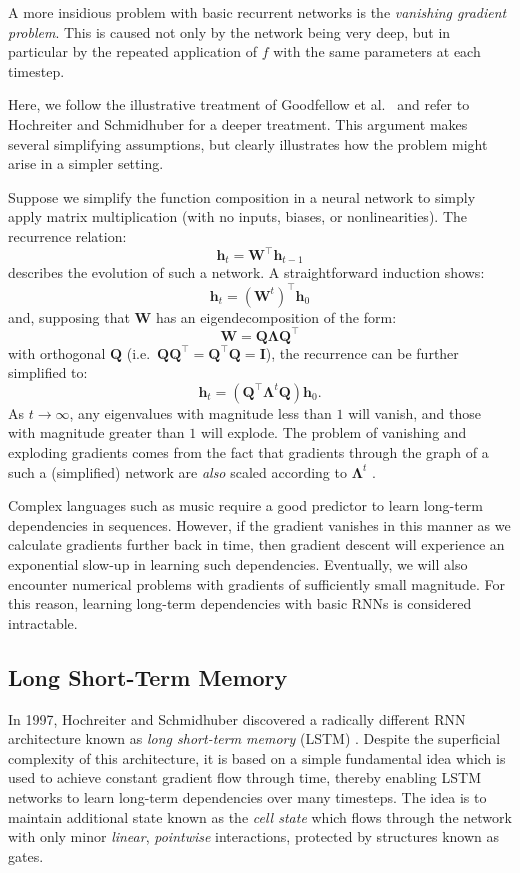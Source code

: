 \documentclass[12pt,a4paper,twoside,openright]{report}
\newcommand{\vect}[1]{\boldsymbol{\mathbf{#1}}}
\begin{document}
A more insidious problem with basic recurrent networks is the \emph{vanishing
gradient problem}. This is caused not only by the network being very deep, but
in particular by the repeated application of $f$ with the same parameters at
each timestep.

Here, we follow the illustrative treatment of Goodfellow et al.\
\cite{Goodfellow-et-al-2016} and refer to Hochreiter and Schmidhuber
\cite{hochreiter1997long} for a deeper treatment. This argument makes several
simplifying assumptions, but clearly illustrates how the problem might arise in
a simpler setting.

Suppose we simplify the function composition in a neural network to simply apply
matrix multiplication (with no inputs, biases, or nonlinearities). The
recurrence relation: 
$$ \vect{h}_t = \vect{W}^\top \vect{h}_{t-1} $$ 
describes the evolution of such a network. A straightforward induction shows:
$$ \vect{h}_t = (\vect{W}^t)^\top\vect{h}_0 $$
and, supposing that $\vect{W}$ has an eigendecomposition of the form:
$$ \vect{W} = \vect{Q}\vect{\Lambda}\vect{Q}^\top $$
with orthogonal $\vect{Q}$ (i.e.\ $\vect{Q}\vect{Q}^\top = \vect{Q}^\top\vect{Q}
= \vect{I}$), the recurrence can be further simplified to:
$$ \vect{h}_t = (\vect{Q}^\top \vect{\Lambda}^t \vect{Q}) \vect{h}_0. $$
As $t \rightarrow \infty$, any eigenvalues with magnitude less than $1$ will
vanish, and those with magnitude greater than $1$ will explode. The problem of
vanishing and exploding gradients comes from the fact that gradients through the
graph of a such a (simplified) network are \emph{also} scaled according to
$\vect{\Lambda}^t$ \cite{Goodfellow-et-al-2016}.

Complex languages such as music require a good predictor to learn long-term
dependencies in sequences. However, if the gradient vanishes in this manner as
we calculate gradients further back in time, then gradient descent will
experience an exponential slow-up in learning such dependencies. Eventually,
we will also encounter numerical problems with gradients of sufficiently small
magnitude. For this reason, learning long-term dependencies with basic RNNs is
considered intractable.

\subsection{Long Short-Term Memory}

In 1997, Hochreiter and Schmidhuber discovered a radically different RNN
architecture known as \emph{long short-term memory} (LSTM)
\cite{hochreiter1997long}. Despite the superficial complexity of this
architecture, it is based on a simple fundamental idea which is used to achieve
constant gradient flow through time, thereby enabling LSTM networks to learn
long-term dependencies over many timesteps. The idea is to maintain additional
state known as the \emph{cell state} which flows through the network with only
minor \emph{linear}, \emph{pointwise} interactions, protected by structures
known as gates. 
\end{document}
